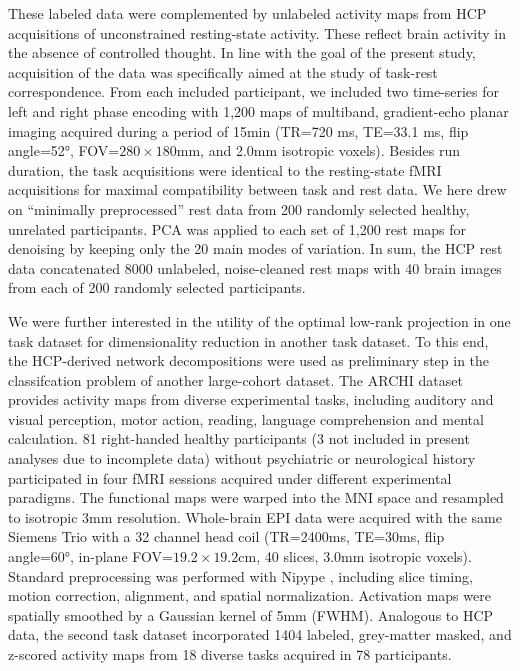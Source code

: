 \documentclass{article} %
\begin{document}
These labeled data were complemented by unlabeled activity maps
from HCP acquisitions of unconstrained resting-state activity.
These reflect brain activity in the absence of controlled thought.
In line with the goal of the present study, acquisition of the data was
specifically aimed at the study of task-rest correspondence.
From each included participant, we included two
time-series for left and right phase encoding
with 1,200 maps of multiband, gradient-echo planar imaging acquired
during a period of 15min (TR=720 ms, TE=33.1 ms, flip angle=52°,
FOV=$280\times180$mm, and 2.0mm isotropic voxels). Besides run duration,
the task acquisitions were identical to the resting-state fMRI acquisitions
for maximal compatibility between task and rest data.
We here drew on ``minimally preprocessed'' rest data
from 200 randomly selected healthy, unrelated participants.
PCA was applied to each set of 1,200 rest maps for
denoising by keeping only the 20 main modes of
variation.
In sum, the HCP rest data concatenated
8000 unlabeled, noise-cleaned rest maps with
40 brain images from each of 200 randomly selected participants.

We were further interested in the utility of the optimal low-rank projection
in one task dataset for dimensionality reduction in another task dataset.
To this end, the HCP-derived network decompositions were used as preliminary
step in the classifcation problem of another large-cohort dataset.
The ARCHI dataset \cite{pinel07} provides activity maps from
diverse experimental tasks, including auditory and visual perception, motor action,
reading, language comprehension and mental calculation.
81 right-handed healthy participants
(3 not included in present analyses due to incomplete data)
without psychiatric or
neurological history participated in four fMRI sessions acquired under
different experimental paradigms.
The functional maps were warped into
the MNI space and resampled to isotropic 3mm resolution.
Whole-brain EPI data were acquired with the same Siemens Trio with a 32
channel head coil (TR=2400ms, TE=30ms, flip angle=60°, in-plane
FOV=$19.2\times19.2$cm, 40 slices, 3.0mm isotropic voxels).
Standard preprocessing was performed with Nipype \cite{gorgo11}, including
slice timing, motion correction, alignment, and spatial normalization.
Activation maps were spatially smoothed by
a Gaussian kernel of 5mm (FWHM).
Analogous to HCP data, the second task dataset incorporated 1404
labeled, grey-matter masked, and z-scored activity maps
from 18 diverse tasks acquired in 78 participants.
\end{document}
